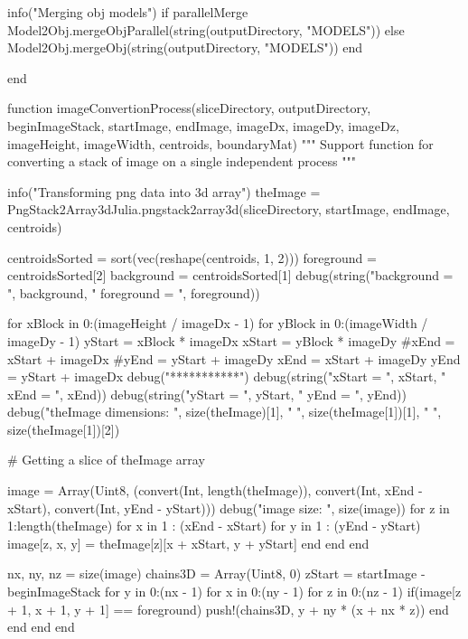 \documentclass[11pt,oneside]{article}	%
\begin{document}
{  info("Merging obj models")
  if parallelMerge
    Model2Obj.mergeObjParallel(string(outputDirectory, "MODELS"))
  else
    Model2Obj.mergeObj(string(outputDirectory, "MODELS"))
  end

end

function imageConvertionProcess(sliceDirectory, outputDirectory,
                                beginImageStack, startImage, endImage,
                                imageDx, imageDy, imageDz,
                                imageHeight, imageWidth,
                                centroids, boundaryMat)
  """
  Support function for converting a stack of image on a single
  independent process
  """

  info("Transforming png data into 3d array")
  theImage = PngStack2Array3dJulia.pngstack2array3d(sliceDirectory, startImage, endImage, centroids)

  centroidsSorted = sort(vec(reshape(centroids, 1, 2)))
  foreground = centroidsSorted[2]
  background = centroidsSorted[1]
  debug(string("background = ", background, " foreground = ", foreground))

  for xBlock in 0:(imageHeight / imageDx - 1)
    for yBlock in 0:(imageWidth / imageDy - 1)
      yStart = xBlock * imageDx
      xStart = yBlock * imageDy
      #xEnd = xStart + imageDx
      #yEnd = yStart + imageDy
      xEnd = xStart + imageDy
      yEnd = yStart + imageDx
      debug("***********")
      debug(string("xStart = ", xStart, " xEnd = ", xEnd))
      debug(string("yStart = ", yStart, " yEnd = ", yEnd))
      debug("theImage dimensions: ", size(theImage)[1], " ", size(theImage[1])[1], " ", size(theImage[1])[2])

      # Getting a slice of theImage array

      image = Array(Uint8, (convert(Int, length(theImage)), convert(Int, xEnd - xStart), convert(Int, yEnd - yStart)))
      debug("image size: ", size(image))
      for z in 1:length(theImage)
        for x in 1 : (xEnd - xStart)
          for y in 1 : (yEnd - yStart)
            image[z, x, y] = theImage[z][x + xStart, y + yStart]
          end
        end
      end

      nx, ny, nz = size(image)
      chains3D = Array(Uint8, 0)
      zStart = startImage - beginImageStack
      for y in 0:(nx - 1)
        for x in 0:(ny - 1)
          for z in 0:(nz - 1)
            if(image[z + 1, x + 1, y + 1] == foreground)
              push!(chains3D, y + ny * (x + nx * z))
            end
          end
        end
      end

}
\end{document}
